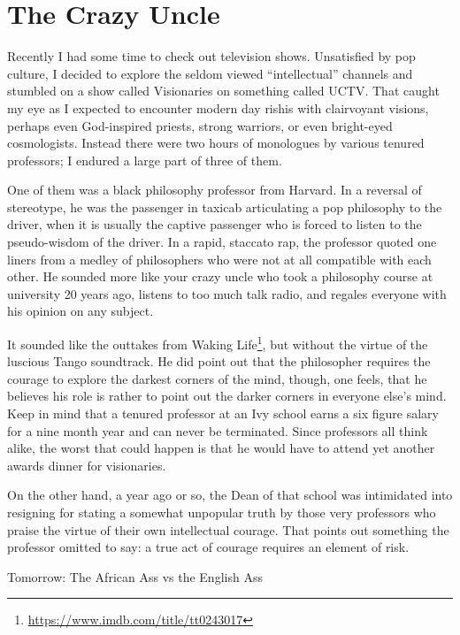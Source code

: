 \section{The Crazy Uncle}

Recently I had some time to check out television shows. Unsatisfied by pop culture, I decided to explore the seldom viewed ``intellectual'' channels and stumbled on a show called Visionaries on something called UCTV. That caught my eye as I expected to encounter modern day rishis with clairvoyant visions, perhaps even God-inspired priests, strong warriors, or even bright-eyed cosmologists. Instead there were two hours of monologues by various tenured professors; I endured a large part of three of them.

One of them was a black philosophy professor from Harvard. In a reversal of stereotype, he was the passenger in taxicab articulating a pop philosophy to the driver, when it is usually the captive passenger who is forced to listen to the pseudo-wisdom of the driver. In a rapid, staccato rap, the professor quoted one liners from a medley of philosophers who were not at all compatible with each other. He sounded more like your crazy uncle who took a philosophy course at university 20 years ago, listens to too much talk radio, and regales everyone with his opinion on any subject.

It sounded like the outtakes from Waking Life\footnote{\url{https://www.imdb.com/title/tt0243017}}, but without the virtue of the luscious Tango soundtrack. He did point out that the philosopher requires the courage to explore the darkest corners of the mind, though, one feels, that he believes his role is rather to point out the darker corners in everyone else's mind. Keep in mind that a tenured professor at an Ivy school earns a six figure salary for a nine month year and can never be terminated. Since professors all think alike, the worst that could happen is that he would have to attend yet another awards dinner for visionaries.

On the other hand, a year ago or so, the Dean of that school was intimidated into resigning for stating a somewhat unpopular truth by those very professors who praise the virtue of their own intellectual courage. That points out something the professor omitted to say: a true act of courage requires an element of risk.

Tomorrow: The African Ass vs the English Ass



